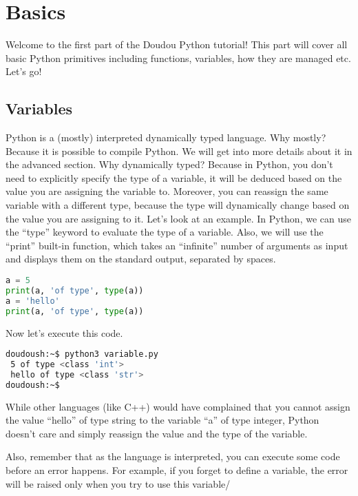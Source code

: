 
\section{Basics}

Welcome to the first part of the Doudou Python tutorial!  This part
will cover all basic Python primitives including functions, variables,
how they are managed etc. Let's go!

\subsection{Variables}

Python is a (mostly) interpreted dynamically typed language. Why
mostly? Because it is possible to compile Python. We will get into
more details about it in the advanced section. Why dynamically typed?
Because in Python, you don't need to explicitly specify the type of a
variable, it will be deduced based on the value you are assigning the
variable to. Moreover, you can reassign the same variable with a
different type, because the type will dynamically change based on the
value you are assigning to it. Let's look at an example. In Python,
we can use the ``type'' keyword to evaluate the type of a variable.
Also, we will use the ``print'' built-in function, which takes an
``infinite'' number of arguments as input and displays them on the
standard output, separated by spaces.

\begin{lstlisting}[language=python]
a = 5
print(a, 'of type', type(a))
a = 'hello'
print(a, 'of type', type(a))
\end{lstlisting}

Now let's execute this code.

\begin{lstlisting}[language=bash]
doudoush:~$ python3 variable.py
 5 of type <class 'int'>
 hello of type <class 'str'>
doudoush:~$
\end{lstlisting}

While other languages (like C++) would have complained that you cannot assign
the value ``hello'' of type string to the variable ``a'' of type integer, Python
doesn't care and simply reassign the value and the type of the variable.

\vspace{5mm}
Also, remember that as the language is interpreted, you can execute some code before
an error happens. For example, if you forget to define a variable, the error will
be raised only when you try to use this variable/

